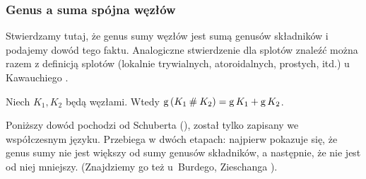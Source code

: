 
\subsubsection{Genus a suma spójna węzłów}

Stwierdzamy tutaj, że genus sumy węzłów jest sumą genusów składników i podajemy dowód tego faktu.
Analogiczne stwierdzenie dla splotów znaleźć można razem z definicją splotów (lokalnie trywialnych, atoroidalnych, prostych, itd.) u Kawauchiego \cite[s. 33-34]{kawauchi1996}.
%
%
%

\begin{proposition}
    \label{prp:genus_of_sum}
    Niech $K_1, K_2$ będą węzłami.
    Wtedy $\operatorname{g} {(K_1 \mathbin{\#} K_2)} = \operatorname{g} K_1 + \operatorname{g} K_2$.
\end{proposition}

Poniższy dowód pochodzi od Schuberta (\cite{schubert1949}), został tylko zapisany we współczesnym języku.
%
Przebiega w dwóch etapach: najpierw pokazuje się, że genus sumy nie jest większy od sumy genusów składników, a następnie, że nie jest od niej mniejszy.
(Znajdziemy go też u~Burdego, Zieschanga \cite[s. 98]{burde2014}).

